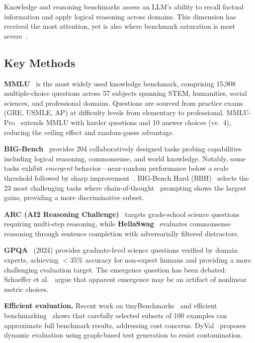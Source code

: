 \documentclass[11pt]{article}
\begin{document}
Knowledge and reasoning benchmarks assess an LLM's ability to recall factual information and apply logical reasoning across domains. This dimension has received the most attention, yet is also where benchmark saturation is most severe~\cite{bowman2021fix,dehghani2021benchmark}.

\subsection{Key Methods}

\textbf{MMLU}~\cite{hendrycks2021mmlu} is the most widely used knowledge benchmark, comprising 15,908 multiple-choice questions across 57 subjects spanning STEM, humanities, social sciences, and professional domains. Questions are sourced from practice exams (GRE, USMLE, AP) at difficulty levels from elementary to professional. MMLU-Pro~\cite{wang2024mmluPro} extends MMLU with harder questions and 10 answer choices (vs.\ 4), reducing the ceiling effect and random-guess advantage.

\textbf{BIG-Bench}~\cite{srivastava2022bigbench} provides 204 collaboratively designed tasks probing capabilities including logical reasoning, commonsense, and world knowledge. Notably, some tasks exhibit \emph{emergent} behavior---near-random performance below a scale threshold followed by sharp improvement~\cite{wei2022emergent}. BIG-Bench Hard (BBH)~\cite{suzgun2023bbh} selects the 23 most challenging tasks where chain-of-thought~\cite{wei2022chain} prompting shows the largest gains, providing a more discriminative subset.

\textbf{ARC (AI2 Reasoning Challenge)}~\cite{clark2018arc} targets grade-school science questions requiring multi-step reasoning, while \textbf{HellaSwag}~\cite{zellers2019hellaswag} evaluates commonsense reasoning through sentence completion with adversarially filtered distractors.

\textbf{GPQA}~\cite{rein2024gpqa} (2024) provides graduate-level science questions verified by domain experts, achieving $<$35\% accuracy for non-expert humans and providing a more challenging evaluation target. The emergence question has been debated: Schaeffer et al.~\cite{schaeffer2023mirage} argue that apparent emergence may be an artifact of nonlinear metric choices.

\textbf{Efficient evaluation.} Recent work on tinyBenchmarks~\cite{polo2024tinybenchmarks} and efficient benchmarking~\cite{perlitz2024efficient} shows that carefully selected subsets of 100 examples can approximate full benchmark results, addressing cost concerns. DyVal~\cite{zhu2024dyval} proposes dynamic evaluation using graph-based test generation to resist contamination.
\end{document}
